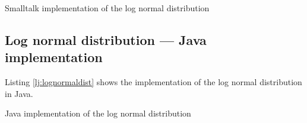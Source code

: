\documentclass[twoside]{book}
\begin{document}
\begin{listing} Smalltalk implementation of the log normal distribution \label{ls:lognormaldist}

\end{listing}

\subsection{Log normal distribution --- Java  implementation}
Listing \ref{lj:lognormaldist} shows the implementation of the log
normal distribution in Java.

\begin{listing} Java implementation of the log normal  distribution \label{lj:lognormaldist}

\end{listing}
\end{document}
